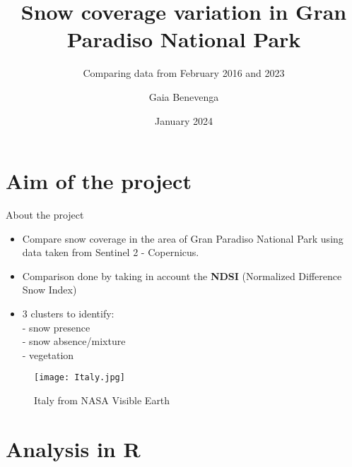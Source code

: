 \documentclass{beamer}
\title{Snow coverage variation in Gran Paradiso National Park}
\subtitle{Comparing data from February 2016 and 2023}
\author{Gaia Benevenga}
\date{January 2024}
\begin{document}
\maketitle


\section{Aim of the project}
\begin{frame}{About the project}
\begin{itemize}
    \item Compare snow coverage in the area of Gran Paradiso National Park using data taken from Sentinel 2 - Copernicus. 
    \item Comparison done by taking in account the \textbf{NDSI} (Normalized Difference Snow Index)  
    \item 3 clusters to identify: \\
    - snow presence\\
    - snow absence/mixture\\
    - vegetation\\
     \end{itemize}  
\end{frame}

\begin{frame}
    
\begin{figure}[Italy from NASA Visible Earth]
    \centering
    \texttt{[image: Italy.jpg]}
    \caption{Italy from NASA Visible Earth}
    \label{Italy from NASA visible Earth}
\end{figure}



\end{frame}


\section{Analysis in R}
\end{document}
